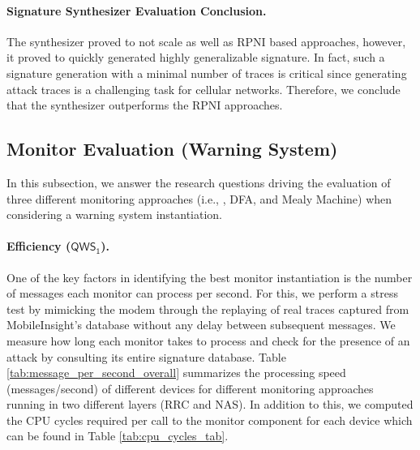 \paragraph{Signature Synthesizer Evaluation Conclusion.}
The \pltl synthesizer proved to not scale as well
as RPNI \cite{rpni} based approaches, however, it proved to quickly generated
highly generalizable signature. In fact, such a signature generation with a minimal number of traces is
critical since generating attack traces is a challenging task for cellular networks.
Therefore, we conclude that the \pltl synthesizer outperforms
the RPNI \cite{rpni} approaches.





\subsection{Monitor Evaluation (Warning System)}
\label{sec:monitor_evaluation_warning_system}
In this subsection, we answer the research questions driving the evaluation
of three different monitoring approaches (i.e., \pltl, DFA, and Mealy Machine)
when considering a warning system instantiation.

\paragraph{Efficiency ($\mathsf{QWS_1}$).}
One of the key factors in identifying the best monitor instantiation
is the number of messages each monitor can process per second.
For this, we perform a stress test by mimicking the modem through the
replaying of real traces captured
from MobileInsight's database \cite{mobile_insight} without any delay
between subsequent messages. We measure how long each monitor takes
to process and check for the presence of an attack by consulting
its entire signature database. Table \ref{tab:message_per_second_overall}
summarizes the processing speed (messages/second) of different
devices for different monitoring approaches running in two different layers
(RRC and NAS). In addition to this, we computed the CPU cycles required per call
to the monitor component for each device which can be found in Table \ref{tab:cpu_cycles_tab}.


